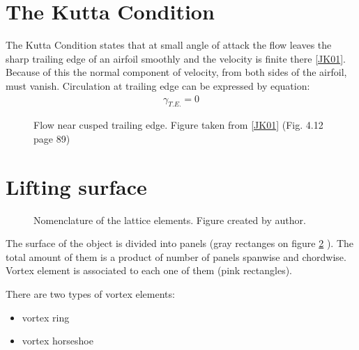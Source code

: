 \documentclass[letterpaper,10pt,english]{jupyterBook}
\let\sphinxpxdimen\pdfpxdimen\else\newdimen\sphinxpxdimen
\begin{document}
\section{The Kutta Condition}
\label{\detokenize{chapters/description/theory:the-kutta-condition}}
\sphinxAtStartPar
The Kutta Condition states that at small angle of attack the flow leaves the sharp trailing edge of an airfoil smoothly and the velocity is finite there {[}\hyperlink{cite.chapters/bibliography:id4}{JK01}{]}. Because of this the normal component of velocity, from both sides of the airfoil, must vanish. Circulation at trailing edge can be expressed by equation:
\begin{equation*}
\begin{split}
\gamma_{T.E.}=0
\end{split}
\end{equation*}
\begin{figure}[htbp]
\centering
\capstart

\noindent{}
\caption{Flow near cusped trailing edge. Figure taken from {[}\hyperlink{cite.chapters/bibliography:id4}{JK01}{]} (Fig. 4.12 page 89)}\label{\detokenize{chapters/description/theory:kutta}}\end{figure}


\section{Lifting surface}
\label{\detokenize{chapters/description/theory:lifting-surface}}
\begin{figure}[htbp]
\centering
\capstart

\noindent\sphinxincludegraphics[height=300\sphinxpxdimen]{{siatka}.png}
\caption{Nomenclature of the lattice elements. Figure created by author.}\label{\detokenize{chapters/description/theory:siatka}}\end{figure}

\sphinxAtStartPar
The surface of the object is divided into panels (gray rectanges on figure \hyperref[\detokenize{chapters/description/theory:siatka}]{\ref{\detokenize{chapters/description/theory:siatka}}} ). The total amount of them is a product of number of panels spanwise and chordwise. Vortex element is associated to each one of them (pink rectangles).

\sphinxAtStartPar
There are two types of vortex elements:
\begin{itemize}
\item {} 
\sphinxAtStartPar
vortex ring

\item {} 
\sphinxAtStartPar
vortex horseshoe

\end{itemize}
\end{document}
